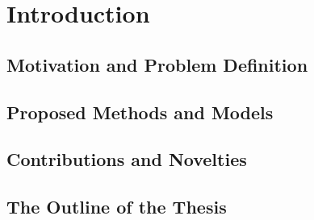 \chapter{Introduction}
\label{chp:introduction}

\section{Motivation and Problem Definition}


\section{Proposed Methods and Models}


\section{Contributions and Novelties}


\section{The Outline of the Thesis}
